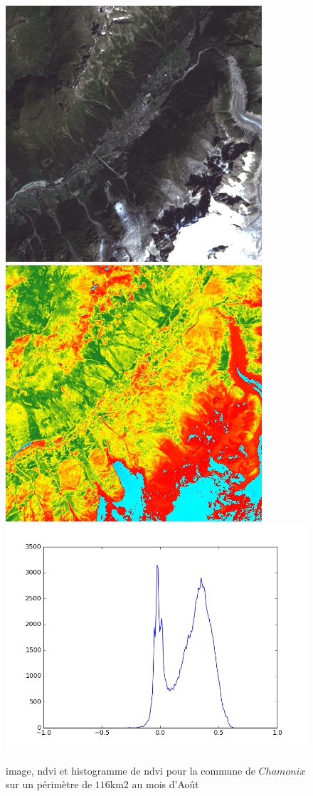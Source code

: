\documentclass{book}
\begin{document}
\begin{figure}[H]
\begin{center}
\includegraphics[scale=0.45]{images/Chamonix/08_rgb.png}
\includegraphics[scale=0.45]{images/Chamonix/08_ndvi.png}
\includegraphics[scale=0.45]{images/Chamonix/08_ndvi_histo.png}
\end{center}
\caption{image, ndvi et histogramme de ndvi pour la commune de $Chamonix$ sur un périmètre de $116$km2 au mois d'Ao\^ut}
\label{chamonix_ndvi}
\end{figure}
\end{document}
